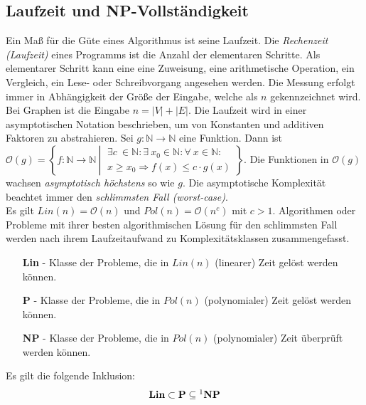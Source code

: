 \subsection{Laufzeit und NP-Vollständigkeit}
Ein Maß für die Güte eines Algorithmus ist seine Laufzeit. Die \emph{Rechenzeit (Laufzeit)} eines Programms ist die Anzahl der elementaren Schritte. Als elementarer Schritt kann eine eine Zuweisung, eine arithmetische Operation, ein Vergleich, ein Lese- oder Schreibvorgang angesehen werden.\vspace{-1mm}\newline\newline
Die Messung erfolgt immer in Abhängigkeit der Größe der Eingabe, welche als $n$ gekennzeichnet wird. Bei Graphen ist die Eingabe $n=|V|+|E|$. Die Laufzeit wird in einer asymptotischen Notation beschrieben, um von Konstanten und additiven Faktoren zu abstrahieren.
Sei $g: {{\mathbb N}} \rightarrow {{\mathbb N}}$ eine Funktion.\newline\newline
Dann ist $\mathcal{O}(g) = \left\{ f:{{\mathbb N}} \rightarrow {{\mathbb N}} ~\left|~
\begin{array}{l}
\exists c~ \in {{\mathbb N}} : \exists~ x_0 \in {{\mathbb N}} : \forall~ x \in {{\mathbb N}} : \\
x \geq x_0 \Rightarrow f(x) \leq c \cdot g(x)
\end{array} \right. \right\}$\cite{buchwanke}.\newline\newline
Die Funktionen in $\mathcal{O}(g)$ wachsen \emph{asymptotisch höchstens} so wie $g$. Die asymptotische Komplexität beachtet immer den \emph{schlimmsten Fall (worst-case)}.\\
Es gilt $Lin(n)=\mathcal{O}(n)$ und $Pol(n)=\mathcal{O}(n^c)$ mit $c>1$.
Algorithmen oder Probleme mit ihrer besten algorithmischen Lösung für den schlimmsten Fall werden nach ihrem Laufzeitaufwand zu Komplexitätsklassen zusammengefasst.
\begin{itemize}
\item[\textbf{Lin}]- Klasse der Probleme, die in $Lin(n)$ (linearer)
Zeit gelöst werden können.
\item[\textbf{P}]- Klasse der Probleme, die in $Pol(n)$ (polynomialer)
Zeit gelöst werden können.
\item[\textbf{NP}]- Klasse der Probleme, die in $Pol(n)$ (polynomialer)
Zeit überprüft werden können.
\end{itemize}
Es gilt die folgende Inklusion: $$\textbf{Lin}\subset\textbf{P}\subseteq\footnote{\text{Ob \textbf{P}=\textbf{NP} oder \textbf{P}$\neq$ \textbf{NP} ist eines der größten noch offenen Probleme in der theoretischen Informatik}}\textbf{NP} $$
\newpage

